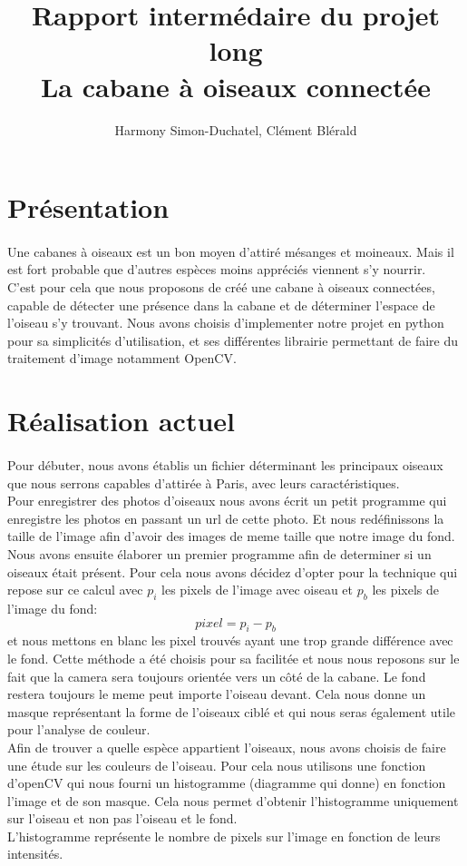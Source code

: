 \documentclass{article}
\title{Rapport intermédaire du projet long \\ La cabane à oiseaux connectée }
\author{Harmony Simon-Duchatel, Clément Blérald}
\begin{document}
\maketitle


\section{Présentation}
\paragraph {}
Une cabanes à oiseaux est un bon moyen d'attiré mésanges et moineaux. Mais il est fort probable que d'autres espèces moins appréciés viennent s'y nourrir. \\
C'est pour cela que nous proposons de créé une cabane à oiseaux connectées, capable de détecter une présence dans la cabane et de déterminer l'espace de l'oiseau s'y trouvant. 
Nous avons choisis d'implementer notre projet en python pour sa simplicités d'utilisation, et ses différentes librairie permettant de faire du traitement d'image notamment OpenCV.
\section{Réalisation actuel} 
\paragraph {}
Pour débuter, nous avons établis un fichier déterminant les principaux oiseaux que nous serrons capables d'attirée à Paris, avec leurs caractéristiques. \\
Pour enregistrer des photos d'oiseaux nous avons écrit un petit programme qui enregistre les photos en passant un url de cette photo. Et nous redéfinissons la taille de l'image
afin d'avoir des images de meme taille que notre image du fond.\\
Nous avons ensuite élaborer un premier programme afin de determiner si un oiseaux était présent.
Pour cela nous avons décidez d'opter pour la technique qui repose sur ce calcul  avec $p_{i}$ les pixels de l'image avec oiseau et $p_{b}$ les pixels de l'image du fond: 
$$
pixel = p_{i} - p_{b}
$$
et nous mettons en blanc les pixel trouvés ayant une trop grande différence avec le fond. Cette méthode a été choisis pour sa facilitée et nous nous reposons sur le fait que la camera sera toujours orientée vers un côté de la cabane. Le fond restera toujours le meme peut importe l'oiseau devant. Cela nous donne un masque représentant la forme de l'oiseaux ciblé et qui nous seras également utile pour l'analyse de couleur.\\
Afin de trouver a quelle espèce appartient l'oiseaux, nous avons choisis de faire une étude sur les couleurs de l'oiseau. Pour cela nous utilisons une fonction d'openCV qui nous fourni un histogramme (diagramme qui donne) en fonction l'image et de son masque. Cela nous permet d'obtenir l'histogramme uniquement sur l'oiseau et non pas l'oiseau et le fond. \\
L'histogramme représente le nombre de pixels sur l'image en fonction de leurs intensités.\\
\end{document}
